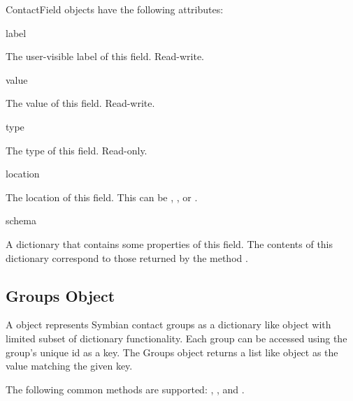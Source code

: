 \begin{classdesc*}{ContactField}
 objects have the following attributes:

\begin{memberdesc}[ContactField]{label}

The user-visible label of this field. Read-write.

\end{memberdesc}

\begin{memberdesc}[ContactField]{value}

The value of this field. Read-write.

\end{memberdesc}

\begin{memberdesc}[ContactField]{type}

The type of this field. Read-only.

\end{memberdesc}

\begin{memberdesc}[ContactField]{location}

The location of this field. This can be , , or 
.

\end{memberdesc}

\begin{memberdesc}[ContactField]{schema}

A dictionary that contains some properties of this field. The contents of this 
dictionary correspond to those returned by the  method 
.

\end{memberdesc}

\end{classdesc*}



\subsection{Groups Object}
\label{subsec:groups}

A  object represents Symbian contact groups as a dictionary
like object with limited subset of dictionary functionality. Each group can
be accessed using the group's unique id as a key. The Groups object returns 
a list like  object as the value matching the given key.

The following common methods are supported: , ,
 and .

